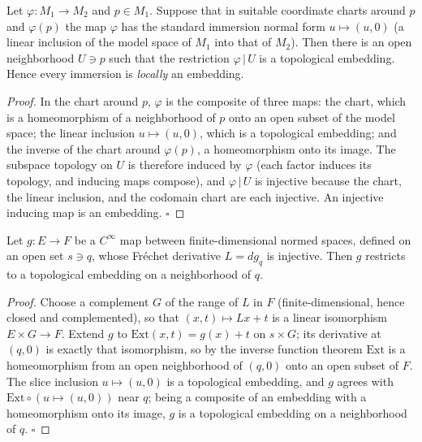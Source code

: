 \begin{lemma}
  \label{lem:dc-ch0-3-7-embedding}
  \leanok
  Let $\varphi:M_1\to M_2$ and $p\in M_1$. Suppose that in suitable coordinate charts
  around $p$ and $\varphi(p)$ the map $\varphi$ has the standard immersion normal form
  $u\mapsto(u,0)$ (a linear inclusion of the model space of $M_1$ into that of $M_2$).
  Then there is an open neighborhood $U\ni p$ such that the restriction $\varphi\,|\,U$ is
  a topological embedding. Hence every immersion is \emph{locally} an embedding.
\end{lemma}
\begin{proof}
  \leanok
  In the chart around $p$, $\varphi$ is the composite of three maps: the chart, which is a
  homeomorphism of a neighborhood of $p$ onto an open subset of the model space; the linear
  inclusion $u\mapsto(u,0)$, which is a topological embedding; and the inverse of the chart
  around $\varphi(p)$, a homeomorphism onto its image. The subspace topology on $U$ is
  therefore induced by $\varphi$ (each factor induces its topology, and inducing maps
  compose), and $\varphi\,|\,U$ is injective because the chart, the linear inclusion, and
  the codomain chart are each injective. An injective inducing map is an embedding. $\square$
\end{proof}

\begin{lemma}
  \label{lem:dc-ch0-3-7-normalform}
  \leanok
  Let $g:E\to F$ be a $C^\infty$ map between finite-dimensional normed spaces, defined on an
  open set $s\ni q$, whose Fréchet derivative $L=dg_q$ is injective. Then $g$ restricts to a
  topological embedding on a neighborhood of $q$.
\end{lemma}
\begin{proof}
  \leanok
  Choose a complement $G$ of the range of $L$ in $F$ (finite-dimensional, hence closed and
  complemented), so that $(x,t)\mapsto Lx+t$ is a linear isomorphism $E\times G\to F$. Extend
  $g$ to $\mathrm{Ext}(x,t)=g(x)+t$ on $s\times G$; its derivative at $(q,0)$ is exactly that
  isomorphism, so by the inverse function theorem $\mathrm{Ext}$ is a homeomorphism from an
  open neighborhood of $(q,0)$ onto an open subset of $F$. The slice inclusion
  $u\mapsto(u,0)$ is a topological embedding, and $g$ agrees with $\mathrm{Ext}\circ(u\mapsto(u,0))$
  near $q$; being a composite of an embedding with a homeomorphism onto its image, $g$ is a
  topological embedding on a neighborhood of $q$. $\square$
\end{proof}

